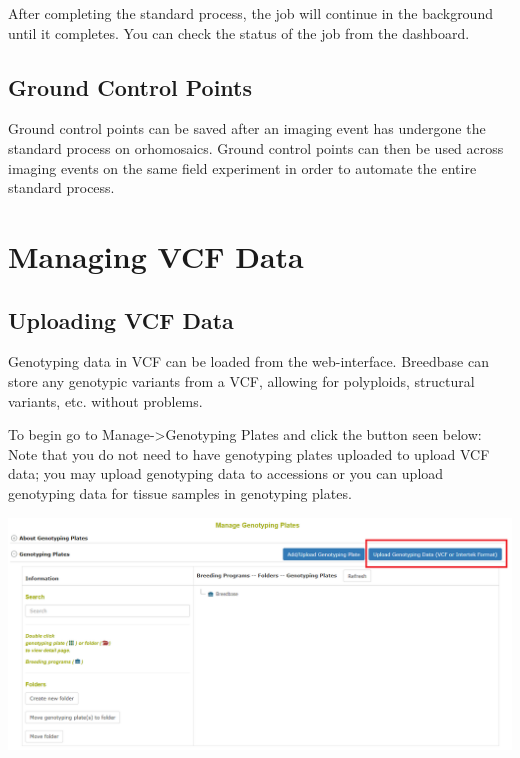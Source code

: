 \documentclass[
  12pt,
]{book}
\begin{document}
After completing the standard process, the job will continue in the background until it completes. You can check the status of the job from the dashboard.

\hypertarget{ground-control-points}{%
\section{Ground Control Points}\label{ground-control-points}}

Ground control points can be saved after an imaging event has undergone the standard process on orhomosaics. Ground control points can then be used across imaging events on the same field experiment in order to automate the entire standard process.

\hypertarget{managing-vcf-data}{%
\chapter{Managing VCF Data}\label{managing-vcf-data}}

\hypertarget{uploading-vcf-data}{%
\section{Uploading VCF Data}\label{uploading-vcf-data}}

Genotyping data in VCF can be loaded from the web-interface. Breedbase can store any genotypic variants from a VCF, allowing for polyploids, structural variants, etc. without problems.

To begin go to Manage-\textgreater Genotyping Plates and click the button seen below: Note that you do not need to have genotyping plates uploaded to upload VCF data; you may upload genotyping data to accessions or you can upload genotyping data for tissue samples in genotyping plates.

\begin{center}\includegraphics[width=0.95\linewidth]{assets/images/manage_genotyping_data_upload_button} \end{center}
\end{document}
